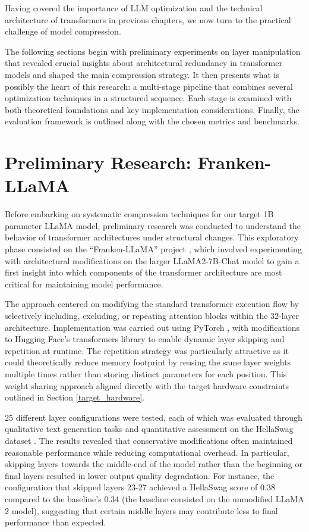 
Having covered the importance of LLM optimization and the technical architecture of transformers in previous chapters, we now turn to the practical challenge of model compression.

The following sections begin with preliminary experiments on layer manipulation that revealed crucial insights about architectural redundancy in transformer models and shaped the main compression strategy. It then presents what is possibly the heart of this research: a multi-stage pipeline that combines several optimization techniques in a structured sequence. Each stage is examined with both theoretical foundations and key implementation considerations. Finally, the evaluation framework is outlined along with the chosen metrics and benchmarks.

\section{Preliminary Research: Franken-LLaMA} \label{frankenllama}

Before embarking on systematic compression techniques for our target 1B parameter LLaMA model, preliminary research was conducted to understand the behavior of transformer architectures under structural changes. This exploratory phase consisted on the ``Franken-LLaMA'' project \cite{franken-llama}, which involved experimenting with architectural modifications on the larger LLaMA2-7B-Chat model \cite{llama2} to gain a first insight into which components of the transformer architecture are most critical for maintaining model performance.

The approach centered on modifying the standard transformer execution flow by selectively including, excluding, or repeating attention blocks within the 32-layer architecture. Implementation was carried out using PyTorch \cite{pytorch}, with modifications to Hugging Face's transformers library \cite{hf_transformers} to enable dynamic layer skipping and repetition at runtime. The repetition strategy was particularly attractive as it could theoretically reduce memory footprint by reusing the same layer weights multiple times rather than storing distinct parameters for each position. This weight sharing approach aligned directly with the target hardware constraints outlined in Section \ref{target_hardware}.

25 different layer configurations were tested, each of which was evaluated through qualitative text generation tasks and quantitative assessment on the HellaSwag dataset \cite{hellaswag}.
The results revealed that conservative modifications often maintained reasonable performance while reducing computational overhead. In particular, skipping layers towards the middle-end of the model rather than the beginning or final layers resulted in lower output quality degradation. For instance, the configuration that skipped layers 23-27 achieved a HellaSwag score of 0.38 compared to the baseline's 0.34 (the baseline consisted on the unmodified LLaMA 2 model), suggesting that certain middle layers may contribute less to final performance than expected.

